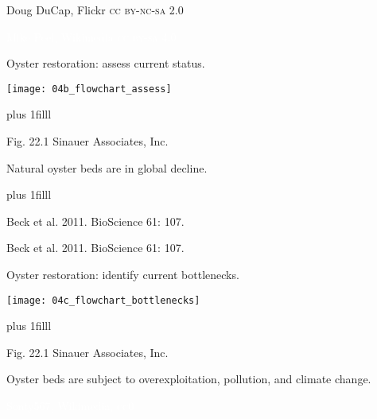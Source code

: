\documentclass[t]{beamer}
\begin{document}
%
{
\begin{frame}[b]

\hfill\tiny\colorbox{gray!50!white}{Doug DuCap, Flickr \textsc{cc by-nc-sa 2.0}}
\end{frame}
}
%
{
\begin{frame}[b]

\tiny\textcolor{white}{Mike Peel, Wikimedia \textsc{cc by-sa 4.0}}
\end{frame}
}
%
\begin{frame}[t]{Oyster restoration: assess current status.}

	\texttt{[image: 04b\_flowchart\_assess]}
	
	\vskip0pt plus 1filll

\hfill\tiny Fig. 22.1 \textcopyright Sinauer Associates, Inc. 
\end{frame}
%
{
\begin{frame}[t]{Natural oyster beds are in global decline.}

\vskip0pt plus 1filll

\hfill\tiny Beck et al. 2011. BioScience 61: 107.
\end{frame}
}
%
{
\begin{frame}[b]

\tiny Beck et al. 2011. BioScience 61: 107.
\end{frame}
}
%
%
\begin{frame}[t]{Oyster restoration: identify current bottlenecks.}

	\texttt{[image: 04c\_flowchart\_bottlenecks]}
	
	\vskip0pt plus 1filll

\hfill\tiny Fig. 22.1 \textcopyright Sinauer Associates, Inc. 
\end{frame}
%
{
\begin{frame}[b]{Oyster beds are subject to overexploitation, pollution, and climate change.}

\hfill\tiny\textcolor{white}{Sonty567, Wikimedia, \textsc{cc0}}
\end{frame}
}
\end{document}
